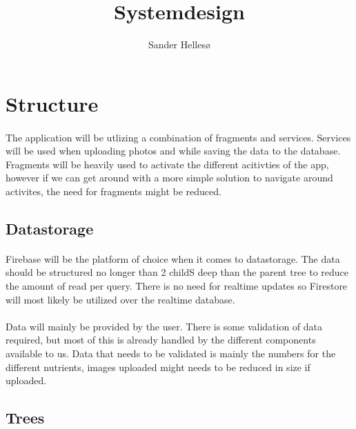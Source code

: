 \documentclass{article}
\title{Systemdesign}
\author{Sander Hellesø}
\begin{document}
  
  \setcounter{page}{1}
  
  \section{Structure}
    \paragraph{}
    The application will be utlizing a combination of fragments and services. Services will be used when uploading photos and while saving the data to the database. 
    Fragments will be heavily used to activate the different acitivties of the app, however if we can get around with a more simple solution to navigate around activites,
    the need for fragments might be reduced.

    \hfill \break
    \hfill \break

    \subsection{Datastorage}
        \paragraph{}
        Firebase will be the platform of choice when it comes to datastorage. The data should be structured no longer than 2 childS deep than the parent tree to reduce the amount of read per query.
        There is no need for realtime updates so Firestore will most likely be utilized over the realtime database.

        \paragraph{}
        Data will mainly be provided by the user. There is some validation of data required, but most of this is already handled by the different components available to us. 
        Data that needs to be validated is mainly the numbers for the different nutrients, images uploaded might needs to be reduced in size if uploaded.

    \hfill \break
    \hfill \break
    
    \subsection{Trees}
\end{document}
